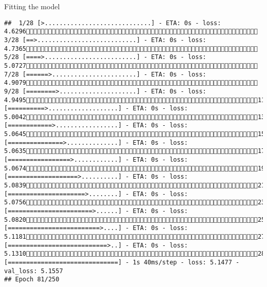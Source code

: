 \documentclass[
  ignorenonframetext,
]{beamer}
\begin{document}
\begin{frame}[fragile]{Fitting the model}
\begin{verbatim}
##  1/28 [>.............................] - ETA: 0s - loss: 4.6296 3/28 [==>...........................] - ETA: 0s - loss: 4.7365 5/28 [====>.........................] - ETA: 0s - loss: 5.0727 7/28 [======>.......................] - ETA: 0s - loss: 4.9079 9/28 [========>.....................] - ETA: 0s - loss: 4.949511/28 [==========>...................] - ETA: 0s - loss: 5.004213/28 [============>.................] - ETA: 0s - loss: 5.064515/28 [===============>..............] - ETA: 0s - loss: 5.063517/28 [=================>............] - ETA: 0s - loss: 5.067419/28 [===================>..........] - ETA: 0s - loss: 5.083921/28 [=====================>........] - ETA: 0s - loss: 5.075623/28 [=======================>......] - ETA: 0s - loss: 5.082025/28 [=========================>....] - ETA: 0s - loss: 5.118127/28 [===========================>..] - ETA: 0s - loss: 5.131028/28 [==============================] - 1s 40ms/step - loss: 5.1477 - val_loss: 5.1557
## Epoch 81/250

\end{verbatim}
\end{frame}
\end{document}
